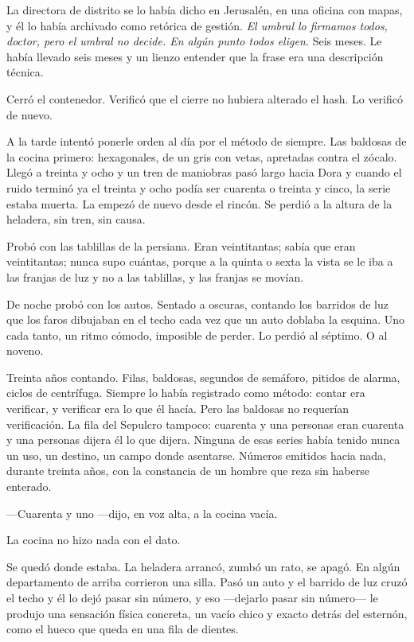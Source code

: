 La directora de distrito se lo había dicho en Jerusalén, en una oficina con mapas, y él lo había archivado como retórica de gestión. \textit{El umbral lo firmamos todos, doctor, pero el umbral no decide. En algún punto todos eligen.} Seis meses. Le había llevado seis meses y un lienzo entender que la frase era una descripción técnica.

Cerró el contenedor. Verificó que el cierre no hubiera alterado el hash. Lo verificó de nuevo.


\scenebreak


A la tarde intentó ponerle orden al día por el método de siempre. Las baldosas de la cocina primero: hexagonales, de un gris con vetas, apretadas contra el zócalo. Llegó a treinta y ocho y un tren de maniobras pasó largo hacia Dora y cuando el ruido terminó ya el treinta y ocho podía ser cuarenta o treinta y cinco, la serie estaba muerta. La empezó de nuevo desde el rincón. Se perdió a la altura de la heladera, sin tren, sin causa.

Probó con las tablillas de la persiana. Eran veintitantas; sabía que eran veintitantas; nunca supo cuántas, porque a la quinta o sexta la vista se le iba a las franjas de luz y no a las tablillas, y las franjas se movían.

De noche probó con los autos. Sentado a oscuras, contando los barridos de luz que los faros dibujaban en el techo cada vez que un auto doblaba la esquina. Uno cada tanto, un ritmo cómodo, imposible de perder. Lo perdió al séptimo. O al noveno.

Treinta años contando. Filas, baldosas, segundos de semáforo, pitidos de alarma, ciclos de centrífuga. Siempre lo había registrado como método: contar era verificar, y verificar era lo que él hacía. Pero las baldosas no requerían verificación. La fila del Sepulcro tampoco: cuarenta y una personas eran cuarenta y una personas dijera él lo que dijera. Ninguna de esas series había tenido nunca un uso, un destino, un campo donde asentarse. Números emitidos hacia nada, durante treinta años, con la constancia de un hombre que reza sin haberse enterado.

---Cuarenta y uno ---dijo, en voz alta, a la cocina vacía.

La cocina no hizo nada con el dato.

Se quedó donde estaba. La heladera arrancó, zumbó un rato, se apagó. En algún departamento de arriba corrieron una silla. Pasó un auto y el barrido de luz cruzó el techo y él lo dejó pasar sin número, y eso ---dejarlo pasar sin número--- le produjo una sensación física concreta, un vacío chico y exacto detrás del esternón, como el hueco que queda en una fila de dientes.

